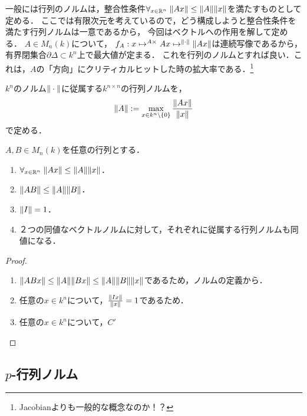 \documentclass[uplatex, dvipdfmx]{jsreport}
\begin{document}
\begin{tcolorbox}[colframe=ForestGreen, colback=ForestGreen!10!white,breakable,colbacktitle=ForestGreen!40!white,coltitle=black,fonttitle=\bfseries\sffamily,
title=]
    一般には行列のノルムは，整合性条件$\forall_{x\in\mathbb{R}^n}\;\|Ax\|\le\|A\|\|x\|$を満たすものとして定める．
    ここでは有限次元を考えているので，どう構成しようと整合性条件を満たす行列ノルムは一意であるから，
    今回はベクトルへの作用を解して定める．
    $A\in M_{n}(k)$について，
    $f_A:x\mapsto^{A\times }Ax\mapsto^{\|\cdot\|}\|Ax\|$は連続写像であるから，有界閉集合$\partial\Delta\subset k^n$上で最大値が定まる．
    これを行列のノルムとすれば良い．これは，$A$の「方向」にクリティカルヒットした時の拡大率である．\footnote{Jacobianよりも一般的な概念なのか！？}
\end{tcolorbox}

\begin{definition}
    $k^n$のノルム$\|\cdot\|$に従属する$k^{n\times n}$の行列ノルムを，
    \[
        \|A\|:=\max_{x\in k^n\setminus\{0\}}\frac{\|Ax\|}{\|x\|}
    \]
    で定める．
\end{definition}

\begin{lemma}[行列ノルムの性質]
    $A,B\in M_n(k)$を任意の行列とする．
    \begin{enumerate}
        \item $\forall_{x\in\mathbb{R}^n}\;\|Ax\|\le\|A\|\|x\|$．
        \item $\|AB\|\le\|A\|\|B\|$．
        \item $\|I\|=1$．
        \item ２つの同値なベクトルノルムに対して，それぞれに従属する行列ノルムも同値になる．
    \end{enumerate}
\end{lemma}
\begin{proof}\mbox{}
    \begin{enumerate}
        \item $\|ABx\|\le\|A\|\|Bx\|\le\|A\|\|B\|\|x\|$であるため，ノルムの定義から．
        \item 任意の$x\in k^n$について，$\frac{\|Ix\|}{\|x\|}=1$であるため．
        \item 任意の$x\in k^n$について，$C'$
    \end{enumerate}
\end{proof}

\subsection{$p$-行列ノルム}
\end{document}
